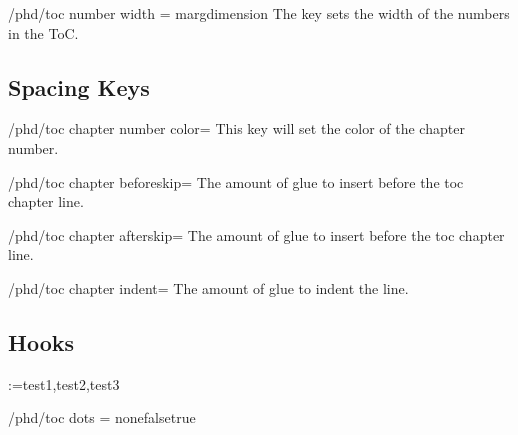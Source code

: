 \begin{key}{/phd/toc number width = marg{dimension}}
The key sets the width of the numbers in the ToC. 
\end{key}

\subsection{Spacing Keys}
\begin{key}{/phd/toc chapter number color=}
This key will set the color of the chapter number.
\end{key}

\begin{key}{/phd/toc chapter beforeskip=}
The amount of glue to insert before the toc chapter line.
\end{key}

\begin{key}{/phd/toc chapter afterskip=}
The amount of glue to insert before the toc chapter line.
\end{key}

\begin{key}{/phd/toc chapter indent=}
The amount of glue to indent the line.
\end{key}
\subsection{Hooks}


\makeatletter
\def\options#1{
\@for\next:=#1\do{%
\textbar\next%
}%
\textbar%
}%
\options{test1,test2,test3}
\makeatother
\begin{key}{/phd/toc dots = \textbar none\textbar false\textbar true}
\end{key}

